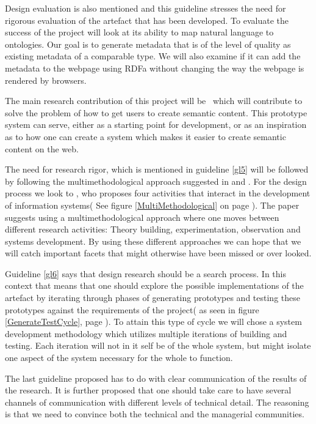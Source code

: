 Design evaluation is also mentioned and this guideline stresses the need for rigorous evaluation of the artefact that has been developed.
To evaluate the success of the project will look at its ability to map natural language to ontologies.
Our goal is to generate metadata that is of the level of quality as existing metadata of a comparable type.
We will also examine if it can add the metadata to the webpage using RDFa without changing the way the webpage is rendered by browsers.

The main research contribution of this project will be \theartefact\,
which will contribute to solve the problem of how to get users to create semantic content.
This prototype system can serve, either as a starting point for development,
or as an inspiration as to how one can create a system which makes it easier to create semantic content on the web.

The need for research rigor, which is mentioned in guideline \ref{gl5} will be followed by following the multimethodological approach suggested in \citet{Chen1990} and \citet{NunamakerJr1990}.
For the design process we look to \citet{Chen1990},
who proposes four activities that interact in the development of information systems( See figure \ref{MultiMethodological} on page \pageref{MultiMethodological}).
The paper suggests using a multimethodological approach where one moves between different research activities:
Theory building, experimentation, observation and systems development.
By using these different approaches we can hope that we will catch important facets that might otherwise have been missed or over looked.

Guideline \ref{gl6} says that design research should be a search process.
In this context that means that one should explore the possible implementations of the artefact by iterating through phases of
generating prototypes and testing these prototypes against the requirements of the project( as seen in figure \ref{GenerateTestCycle},
page \pageref{GenerateTestCycle}).
To attain this type of cycle we will chose a system development methodology which utilizes multiple iterations of building and testing.
Each iteration will not in it self be of the whole system,
but might isolate one aspect of the system necessary for the whole to function.

The last guideline proposed has to do with clear communication of the results of the research.
It is further proposed that one should take care to have several channels of communication with different levels of technical detail.
The reasoning is that we need to convince both the technical and the managerial communities.

